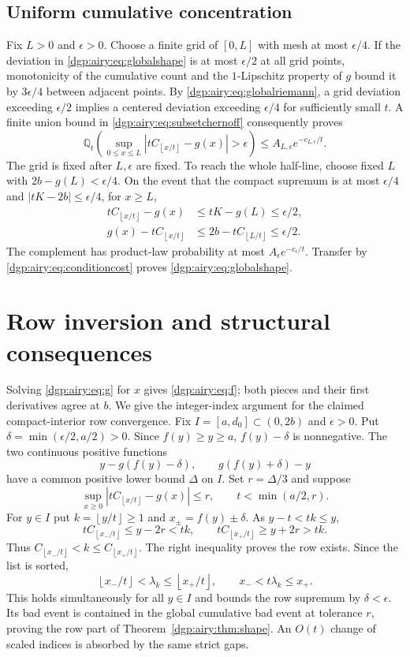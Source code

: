 \documentclass[11pt,letterpaper]{article}
\numberwithin{equation}{section}
\theoremstyle{remark}\newtheorem{remark}[theorem]{Remark}
\newcommand{\QQ}{\mathbb Q}
\newcommand{\floor}[1]{\left\lfloor #1\right\rfloor}
\begin{document}
\subsection{Uniform cumulative concentration}
Fix $L>0$ and $\epsilon>0$. Choose a finite grid of $[0,L]$ with mesh
at most $\epsilon/4$. If the deviation in \eqref{dgp:airy:eq:globalshape}
is at most $\epsilon/2$ at all grid points, monotonicity of the
cumulative count and the $1$-Lipschitz property of $g$ bound it by
$3\epsilon/4$ between adjacent points.
By \eqref{dgp:airy:eq:globalriemann}, a grid deviation exceeding
$\epsilon/2$ implies a centered deviation exceeding $\epsilon/4$
for sufficiently small $t$. A finite union bound in
\eqref{dgp:airy:eq:subsetchernoff} consequently proves
\[
 \QQ_t\!\left(\sup_{0\leq x\leq L}
       |tC_{\floor{x/t}}-g(x)|>\epsilon\right)
 \leq A_{L,\epsilon}e^{-c_{L,\epsilon}/t}.
\]
The grid is fixed after $L,\epsilon$ are fixed.
To reach the whole half-line, choose fixed $L$ with
$2b-g(L)<\epsilon/4$. On the event that the compact supremum is at
most $\epsilon/4$ and $|tK-2b|\leq\epsilon/4$, for $x\geq L$,
\begin{align*}
 tC_{\floor{x/t}}-g(x)&\leq tK-g(L)\leq\epsilon/2,\\
 g(x)-tC_{\floor{x/t}}&\leq2b-tC_{\floor{L/t}}\leq\epsilon/2.
\end{align*}
The complement has product-law probability at most
$A_\epsilon e^{-c_\epsilon/t}$. Transfer by
\eqref{dgp:airy:eq:conditioncost} proves \eqref{dgp:airy:eq:globalshape}.

\section{Row inversion and structural consequences}\label{dgp:airy:sec:rows}
Solving \eqref{dgp:airy:eq:g} for $x$ gives \eqref{dgp:airy:eq:f}; both pieces and their
first derivatives agree at $b$. We give the integer-index argument
for the claimed compact-interior row convergence.
Fix $I=[a,d_0]\subset(0,2b)$ and $\epsilon>0$. Put
$\delta=\min(\epsilon/2,a/2)>0$. Since $f(y)\geq y\geq a$,
$f(y)-\delta$ is nonnegative. The two continuous positive functions
\[
 y-g(f(y)-\delta),\qquad g(f(y)+\delta)-y
\]
have a common positive lower bound $\Delta$ on $I$. Set
$r=\Delta/3$ and suppose
\[
 \sup_{x\geq0}|tC_{\floor{x/t}}-g(x)|\leq r,
 \qquad t<\min(a/2,r).
\]
For $y\in I$ put $k=\floor{y/t}\geq1$ and
$x_\pm=f(y)\pm\delta$. As $y-t<tk\leq y$,
\[
 tC_{\floor{x_-/t}}\leq y-2r<tk,
 \qquad tC_{\floor{x_+/t}}\geq y+2r>tk.
\]
Thus $C_{\floor{x_-/t}}<k\leq C_{\floor{x_+/t}}$.
The right inequality proves the row exists. Since the list is sorted,
\[
 \floor{x_-/t}<\lambda_k\leq\floor{x_+/t},
 \qquad x_-<t\lambda_k\leq x_+.
\]
This holds simultaneously for all $y\in I$ and bounds the row
supremum by $\delta<\epsilon$. Its bad event is contained in the
global cumulative bad event at tolerance $r$, proving the row part
of Theorem~\ref{dgp:airy:thm:shape}. An $O(t)$ change of scaled indices is
absorbed by the same strict gaps.
\end{document}

